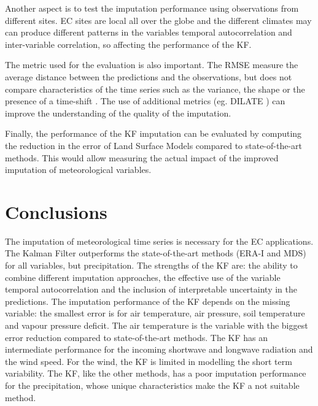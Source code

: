 \documentclass{article}
\let\Oldsection\section
\renewcommand{\section}{\FloatBarrier\Oldsection}
\begin{document}
Another aspect is to test the imputation performance using observations from different sites. EC sites are local all over the globe \cite{pastorello_fluxnet2015_2020} and the different climates may can produce different patterns in the variables temporal autocorrelation and inter-variable correlation, so affecting the performance of the KF.

The metric used for the evaluation is also important. The RMSE measure the average distance between the predictions and the observations, but does not compare characteristics of the time series such as the variance, the shape or the presence of a time-shift \cite{guen_shape_nodate}. The use of additional metrics (eg. DILATE \cite{guen_shape_nodate}) can improve the understanding of the quality of the imputation.

Finally, the performance of the KF imputation can be evaluated by computing the reduction in the error of Land Surface Models compared to state-of-the-art methods. This would allow measuring the actual impact of the improved imputation of meteorological variables. 

\pagebreak

\section{Conclusions}

The imputation of meteorological time series is necessary for the EC applications. The Kalman Filter outperforms the state-of-the-art methods (ERA-I and MDS) for all variables, but precipitation. The strengths of the KF are: the ability to combine different imputation approaches, the effective use of the variable temporal autocorrelation and the inclusion of interpretable uncertainty in the predictions. 
The imputation performance of the KF depends on the missing variable: the smallest error is for air temperature, air pressure, soil temperature and vapour pressure deficit. The air temperature is the variable with the biggest error reduction compared to state-of-the-art methods. The KF has an intermediate performance for the incoming shortwave and longwave radiation and the wind speed. For the wind, the KF is limited in modelling the short term variability. The KF, like the other methods, has a poor imputation performance for the precipitation, whose unique characteristics make the KF a not suitable method.
\end{document}
